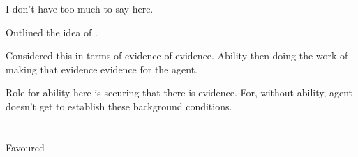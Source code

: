 \begin{note}
  I don't have too much to say here.

  Outlined the idea of \AR{}.

  Considered this in terms of evidence of evidence.
  Ability then doing the work of making that evidence evidence for the agent.

  Role for ability here is securing that there is evidence.
  For, without ability, agent doesn't get to establish these background conditions.
\end{note}

\section{\WR{}}
\label{sec:wr-2}

\begin{note}
  Favoured
\end{note}


